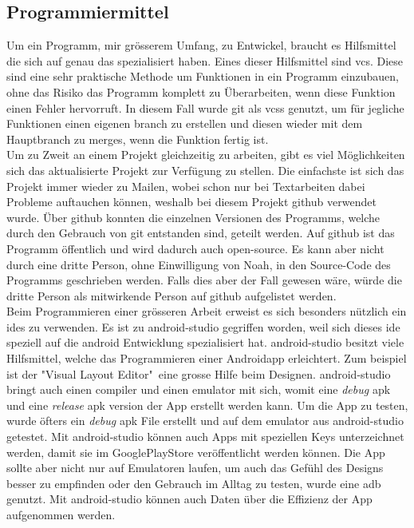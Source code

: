 \documentclass[a4paper,11pt]{article}
\begin{document}
\subsection{Programmiermittel}

Um ein Programm, mir grösserem Umfang, zu Entwickel, braucht es Hilfsmittel die sich auf genau das spezialisiert haben. 
Eines dieser Hilfsmittel sind \gls{vcs}. Diese sind eine sehr praktische Methode um Funktionen in ein Programm einzubauen, ohne das Risiko 
das Programm komplett zu Überarbeiten, wenn diese Funktion einen Fehler hervorruft. In diesem Fall wurde \Gls{git} als \Glspl{vcs} genutzt, um für jegliche Funktionen
einen eigenen \gls{branch} zu erstellen und diesen wieder mit dem Hauptbranch zu \glspl{merge}, wenn die Funktion fertig ist.\cite{git} \cite{github} \\

Um zu Zweit an einem Projekt gleichzeitig zu arbeiten, gibt es viel Möglichkeiten sich das aktualisierte Projekt zur Verfügung zu stellen. Die einfachste ist sich das 
Projekt immer wieder zu Mailen, wobei schon nur bei Textarbeiten dabei Probleme auftauchen können, weshalb bei diesem Projekt \Gls{github} 
verwendet wurde. Über \gls{github} konnten die einzelnen Versionen des Programms, welche durch den Gebrauch von \gls{git} entstanden sind, geteilt werden. 
Auf \gls{github} ist das Programm öffentlich und wird dadurch auch open-source. Es kann aber nicht durch eine dritte Person, ohne Einwilligung von Noah, in den Source-Code
des Programms geschrieben werden. Falls dies aber der Fall gewesen wäre, würde die dritte Person als mitwirkende Person auf \gls{github} aufgelistet werden. \cite{github} \\

Beim Programmieren einer grösseren Arbeit erweist es sich besonders nützlich ein \glspl{ide} zu verwenden. Es ist zu \gls{android-studio} gegriffen worden, weil sich dieses \gls{ide}
speziell auf die android Entwicklung spezialisiert hat. \gls{android-studio} besitzt viele Hilfsmittel, welche das Programmieren einer Androidapp erleichtert. Zum beispiel ist der
"Visual Layout Editor"\ eine grosse Hilfe beim Designen. \gls{android-studio} bringt auch einen \gls{compiler} und einen \gls{emulator} mit sich, womit eine \textit{debug} \gls{apk} und eine
\textit{release} \gls{apk} version der App erstellt werden kann. Um die App zu testen, wurde öfters ein \textit{debug} \gls{apk} File erstellt und auf dem \gls{emulator} aus \gls{android-studio}
getestet. Mit \gls{android-studio} können auch Apps mit speziellen Keys unterzeichnet werden, damit sie im GooglePlayStore veröffentlicht werden können.
Die App sollte aber nicht nur auf Emulatoren laufen, um auch das Gefühl des Designs besser zu empfinden oder den Gebrauch im Alltag zu testen, wurde eine \gls{adb} genutzt.
Mit \gls{android-studio} können auch Daten über die Effizienz der App aufgenommen werden. 
\cite{android-studio} \\
\end{document}
